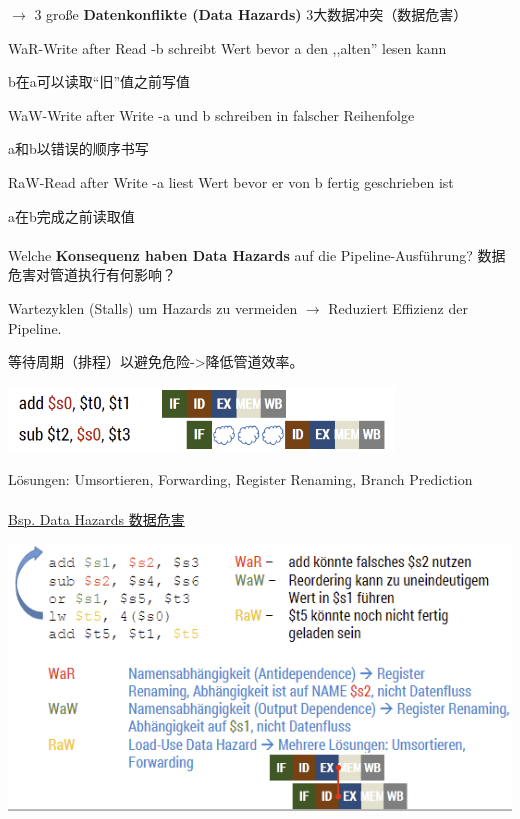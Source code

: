 \documentclass[fleqn]{article}
\begin{document}
$\rightarrow$ 3 große \textbf{Datenkonflikte (Data Hazards)} 3大数据冲突（数据危害）

WaR-Write after Read    \qquad\qquad     -b schreibt Wert bevor a den ,,alten'' lesen kann

b在a可以读取“旧”值之前写值

WaW-Write after Write     \qquad\qquad  -a und b schreiben in falscher Reihenfolge

a和b以错误的顺序书写

RaW-Read after Write       \qquad\qquad  -a liest Wert bevor er von b fertig geschrieben ist

a在b完成之前读取值
\\
\\
Welche \textbf{Konsequenz haben Data Hazards} auf die Pipeline-Ausführung? 数据危害对管道执行有何影响？

Wartezyklen (Stalls) um Hazards zu vermeiden $\rightarrow$ Reduziert Effizienz der Pipeline.

等待周期（排程）以避免危险->降低管道效率。

\begin{center}
    \includegraphics[scale=0.5]{32.png}
\end{center}

Lösungen: Umsortieren, Forwarding, Register Renaming, Branch Prediction
\\
\\
\noindent\underline{Bsp. Data Hazards 数据危害}

\begin{center}
    \includegraphics[scale=0.6]{33.png}
\end{center}
\end{document}
